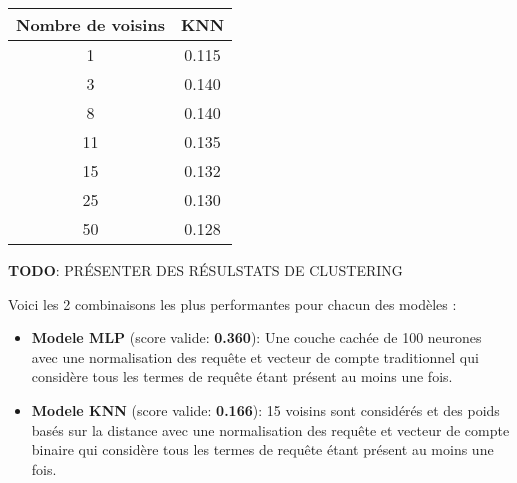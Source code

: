 \begin{center}
\begin{tabular}{|c|c|}
\hline
\textbf{Nombre de voisins} & KNN \\ \hline
1 & 0.115 \\ \hline
3 & 0.140 \\ \hline
8 & 0.140 \\ \hline
11 & 0.135 \\ \hline
15 & 0.132 \\ \hline
25 & 0.130 \\ \hline
50 & 0.128 \\ \hline
\end{tabular}
\end{center}

\textbf{TODO}: PRÉSENTER DES RÉSULSTATS DE CLUSTERING

Voici les 2 combinaisons les plus performantes pour chacun des modèles :

\begin{itemize}
  \item \textbf{Modele MLP} (score valide: \textbf{0.360}): Une couche cachée de 100 neurones avec une normalisation des requête et vecteur de compte traditionnel qui considère tous les termes de requête étant présent au moins une fois.
  \item \textbf{Modele KNN} (score valide: \textbf{0.166}): 15 voisins sont considérés et des poids basés sur la distance avec une normalisation des requête et vecteur de compte binaire qui considère tous les termes de requête étant présent au moins une fois.
\end{itemize}




